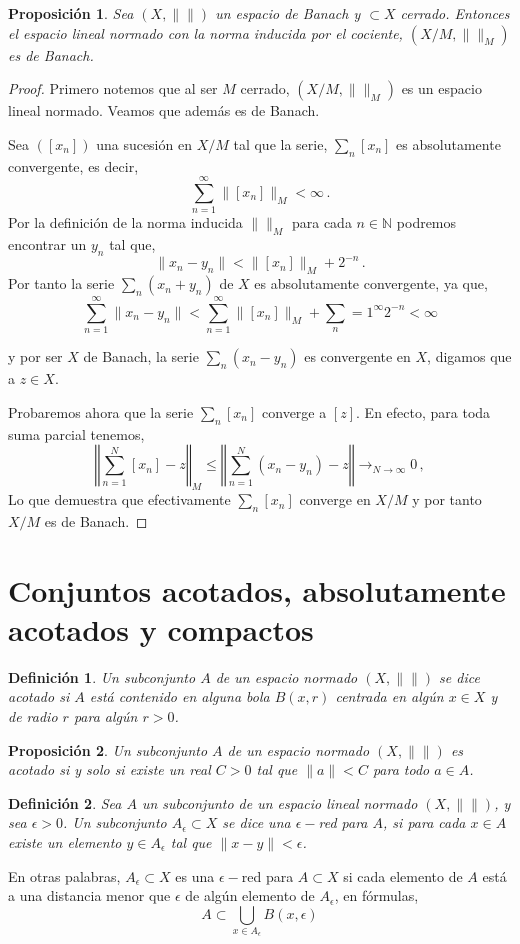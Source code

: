 \documentclass[12pt]{book}
\newtheorem{defn}{\bf Definición}[chapter]
\newtheorem{prop}{\bf Proposición}[chapter]
\def\NN{\mathbb{N}}
\newcommand{\norm}[1]{\lVert #1\rVert }
\begin{document}
\begin{prop} Sea $(X,\norm{})$ un espacio de Banach y $\subset X$ cerrado. Entonces el espacio 
lineal normado con la norma inducida  por el  cociente, $(X/M,\norm{}_M)$ es de Banach.
\end{prop}
\begin{proof}
Primero notemos que al  ser $M$ cerrado, $(X/M,\norm{}_M)$ es  un espacio lineal normado. 
Veamos que además es de Banach.

Sea $([x_n])$ una sucesión en $X/M$ tal que la serie, $\sum_n [x_n]$ es absolutamente 
convergente, es decir,
$$\sum_{n=1}^\infty\norm{[x_n]}_M <\infty\,.$$
Por la definición de la norma inducida $\norm{}_M$ para cada $n\in\NN$ podremos encontrar un 
$y_n$ tal que,
$$\norm{x_n-y_n}<\norm{[x_n]}_M + 2^{-n}\,.$$
Por tanto  la serie $\sum_ n (x_n+y_n)$ de $X$ es absolutamente convergente, ya que,
$$\sum_{n=1}^\infty\norm{x_n-y_n} <\sum_{n=1}^\infty \norm{[x_n]}_M +\sum_n=1^\infty 2^{-n}
<\infty$$

y  por ser  $X$ de Banach, la serie $\sum_n (x_n-y_n)$ es convergente en $X$, digamos  que a 
$z\in X$.

Probaremos ahora que la  serie $\sum_n [x_n]$ converge a $[z]$. En efecto, para toda suma 
parcial tenemos,
$$\left\Vert \sum_{n=1}^N [x_n] - z\right\Vert_{M} \leq\left\Vert \sum_{n=1}^N(x_n - y_n) -z \right\Vert 
\mathop{\longrightarrow}_{N\to\infty}0\,,$$
Lo que demuestra que efectivamente $\sum_n [x_n]$ converge en $X/M$ y por tanto $X/M$ es de 
Banach.
\end{proof}  
\section{Conjuntos acotados, absolutamente acotados  y compactos}
\begin{defn}
Un subconjunto $A$ de un espacio normado $(X,\norm{})$ se dice {\emph acotado} si $A$ está 
contenido en alguna bola $B(x,r)$ centrada en algún $x\in X$ y de radio  $r$ para algún $r>0$.
\end{defn}
  \begin{prop} Un subconjunto $A$ de un espacio normado $(X,\norm{})$ es acotado si y solo si 
existe un real $C>0$  tal que $\norm{a}< C$ para todo $a\in A$.
  \end{prop}
 
 \begin{defn} Sea $A$ un subconjunto de un espacio lineal normado $(X,\norm{})$, y sea $
\epsilon>0$. Un subconjunto $A_\epsilon\subset X$ se dice una $\epsilon-$red para $A$, si para 
cada $x\in A$ existe un elemento $y\in A_\epsilon$ tal que $\norm{x-y}<\epsilon$.
 \end{defn}
  En otras palabras, $A_\epsilon\subset X$ es una $\epsilon-$red para $A\subset X$ si cada 
elemento de $A$ está  a  una distancia menor que   $\epsilon$ de algún elemento de $A_\epsilon$, 
en fórmulas,
  $$A\subset \bigcup_{x\in A_\epsilon} B(x,\epsilon)$$
  
\end{document}
